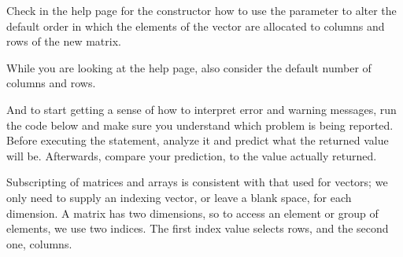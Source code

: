 \documentclass[krantz2]{krantz}\usepackage{knitr}
\begin{document}
\begin{playground}
Check in the help page for the  constructor how to use the  parameter to alter the default order in which the elements of the vector are allocated to columns and rows of the new matrix.

\begin{knitrout}\footnotesize
{}\color{fgcolor}\begin{kframe}
\begin{alltt}
\end{alltt}
\end{kframe}
\end{knitrout}

While you are looking at the help page, also consider the default number of columns and rows.

\begin{knitrout}\footnotesize
{}\color{fgcolor}\begin{kframe}
\begin{alltt}
\hlstd{(}\hlopt{:}\hlstd{)}
\end{alltt}
\end{kframe}
\end{knitrout}

And to start getting a sense of how to interpret error and warning messages, run the code below and make sure you understand which problem is being reported. Before executing the statement, analyze it and predict what the returned value will be. Afterwards, compare your prediction, to the value actually returned.

\begin{knitrout}\footnotesize
{}\color{fgcolor}\begin{kframe}
\begin{alltt}
\hlstd{(}\hlopt{:}\hlstd{,}  \hlstd{=} \hlstd{)}
\end{alltt}
\end{kframe}
\end{knitrout}

\end{playground}

Subscripting of matrices and arrays is consistent with that used for vectors; we only need to supply an indexing vector, or leave a blank space, for each dimension. A matrix has two dimensions, so to access an element or group of elements, we use two indices. The first index value selects rows, and the second one, columns.
\end{document}
